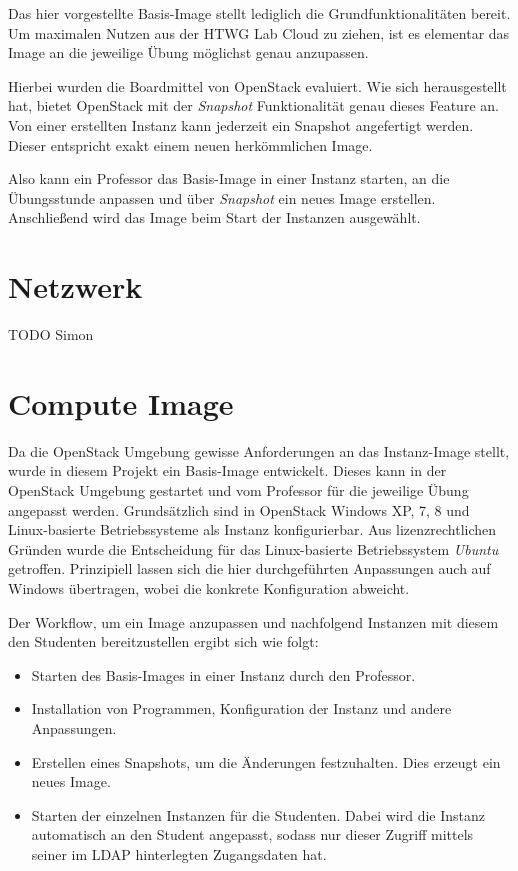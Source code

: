 Das hier vorgestellte Basis-Image stellt lediglich die Grundfunktionalitäten bereit. 
Um maximalen Nutzen aus der HTWG Lab Cloud zu ziehen, ist es elementar das Image an die jeweilige Übung möglichst genau anzupassen.

Hierbei wurden die Boardmittel von OpenStack evaluiert.
Wie sich herausgestellt hat, bietet OpenStack mit der \emph{Snapshot} Funktionalität genau dieses Feature an.
Von einer erstellten Instanz kann jederzeit ein Snapshot angefertigt werden.
Dieser entspricht exakt einem neuen herkömmlichen Image.

Also kann ein Professor das Basis-Image in einer Instanz starten, an die Übungsstunde anpassen und über \emph{Snapshot} ein neues Image erstellen.
Anschließend wird das Image beim Start der Instanzen ausgewählt.

\section{Netzwerk}

TODO Simon


\section{Compute Image}

Da die OpenStack Umgebung gewisse Anforderungen an das Instanz-Image stellt, wurde in diesem Projekt ein Basis-Image entwickelt. 
Dieses kann in der OpenStack Umgebung gestartet und vom Professor für die jeweilige Übung angepasst werden.
Grundsätzlich sind in OpenStack Windows XP, 7, 8 und Linux-basierte Betriebssysteme als Instanz konfigurierbar. 
Aus lizenzrechtlichen Gründen wurde die Entscheidung für das Linux-basierte Betriebssystem \emph{Ubuntu} getroffen. 
Prinzipiell lassen sich die hier durchgeführten Anpassungen auch auf Windows übertragen, wobei die konkrete Konfiguration abweicht.

Der Workflow, um ein Image anzupassen und nachfolgend Instanzen mit diesem den Studenten bereitzustellen ergibt sich wie folgt:

\begin{itemize}
\item Starten des Basis-Images in einer Instanz durch den Professor.
\item Installation von Programmen, Konfiguration der Instanz und andere Anpassungen.
\item Erstellen eines Snapshots, um die Änderungen festzuhalten. Dies erzeugt ein neues Image.
\item Starten der einzelnen Instanzen für die Studenten. Dabei wird die Instanz automatisch an den Student angepasst, sodass nur dieser Zugriff mittels seiner im LDAP hinterlegten Zugangsdaten hat.
\end{itemize}

